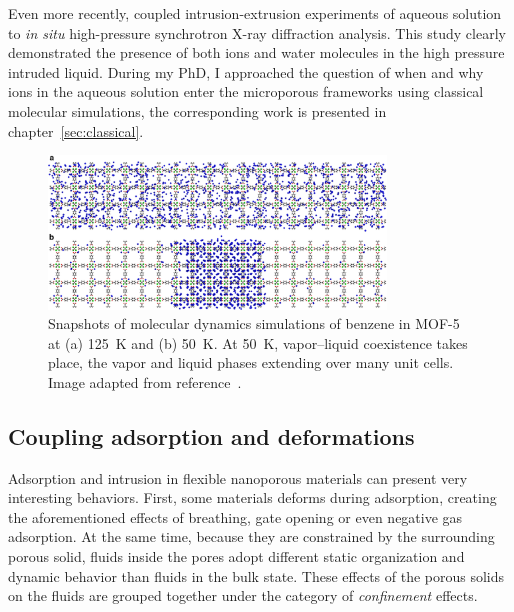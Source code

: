 \documentclass[thesis]{subfiles}
\begin{document}
Even more recently, \citeauthor{Arletti2016}\cite{Arletti2016} coupled
intrusion-extrusion experiments of  aqueous solution to \emph{in situ}
high-pressure synchrotron X-ray diffraction analysis. This study clearly
demonstrated the presence of both ions and water molecules in the high pressure
intruded liquid. During my PhD, I approached the question of when and why ions
in the aqueous solution enter the microporous frameworks using classical
molecular simulations, the corresponding work is presented in
chapter~\ref{sec:classical}.

\begin{figure}[h]
    \centering
    \vspace{8em}
    \includegraphics[width=0.8\textwidth]{figures/cited/mof5-bezene}
    \caption{Snapshots of molecular dynamics simulations of benzene in MOF-5 at
    (a) \SI{125}{K} and (b) \SI{50}{K}. At \SI{50}{K}, vapor–liquid coexistence
    takes place, the vapor and liquid phases extending over many unit cells.
    Image adapted from reference~\cite{Braun2015}.}
    \label{fig:mof5-bezene}
\end{figure}

\newpage

\subsection{Coupling adsorption and deformations}

Adsorption and intrusion in flexible nanoporous materials can present very
interesting behaviors. First, some materials deforms during adsorption, creating
the aforementioned effects of breathing, gate opening or even negative gas
adsorption\cite{Krause2016}. At the same time, because they are constrained by
the surrounding porous solid, fluids inside the pores adopt different static
organization and dynamic behavior than fluids in the bulk state. These effects
of the porous solids on the fluids are grouped together under the category of
\emph{confinement} effects.
\end{document}
